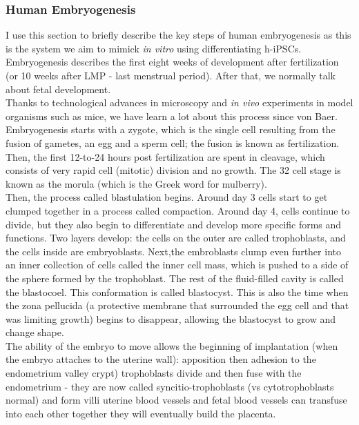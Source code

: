 \subsubsection{Human Embryogenesis}

I use this section to briefly describe the key steps of human embryogenesis as this is the system we aim to mimick \textit{in vitro} using differentiating h-iPSCs.
Embryogenesis describes the first eight weeks of development after fertilization (or 10 weeks after LMP - last menstrual period).
After that, we normally talk about fetal development.\\

Thanks to technological advances in microscopy and \textit{in vivo} experiments in model organisms such as mice, we have learn a lot about this process since von Baer.
Embryogenesis starts with a zygote, which is the single cell resulting from the fusion of gametes, an egg and a sperm cell; the fusion is known as fertilization.
Then, the first 12-to-24 hours post fertilization are spent in cleavage, which consists of very rapid cell (mitotic) division and no growth.
The 32 cell stage is known as the morula (which is the Greek word for mulberry).\\

Then, the process called blastulation begins.
Around day 3 cells start to get clumped together in a process called compaction.
Around day 4, cells continue to divide, but they also begin to differentiate and develop more specific forms and functions.
Two layers develop: the cells on the outer are called trophoblasts, and the cells inside are embryoblasts. 
Next,the embroblasts clump even further into an inner collection of cells called the inner cell mass, which is pushed to a side of the sphere formed by the trophoblast.
The rest of the fluid-filled cavity is called the blastocoel.
This conformation is called blastocyst.
This is also the time when the zona pellucida (a protective membrane that surrounded the egg cell and that was limiting growth) begins to disappear, allowing the blastocyst to grow and change shape.\\

The ability of the embryo to move allows the beginning of implantation (when the embryo attaches to the uterine wall):
apposition then adhesion to the endometrium valley crypt)
trophoblasts divide and then fuse with the endometrium - they are now called syncitio-trophoblasts (vs cytotrophoblasts normal) and form villi
uterine blood vessels and fetal blood vessels can transfuse into each other 
together they will eventually build the placenta.\\

